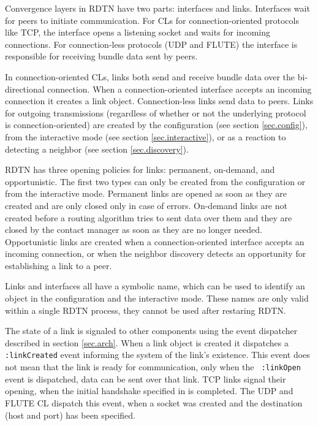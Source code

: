 \documentclass[a4paper]{article}
\begin{document}
Convergence layers in RDTN have two parts: interfaces and links. Interfaces wait
for peers to initiate communication. For CLs for connection-oriented protocols
like TCP, the interface opens a listening socket and waits for incoming
connections. For connection-less protocols (UDP and FLUTE) the interface is
responsible for receiving bundle data sent by peers.

In connection-oriented CLs, links both send and receive bundle data over the
bi-directional connection. When a connection-oriented interface accepts an
incoming connection it creates a link object. Connection-less links send data to
peers. Links for outgoing transmissions (regardless of whether or not the
underlying protocol is connection-oriented) are created by the configuration
(see section \ref{sec.config}), from the interactive mode (see section
\ref{sec.interactive}), or as a reaction to detecting a neighbor (see section
\ref{sec.discovery}).

RDTN has three opening policies for links: permanent, on-demand, and
opportunistic. The first two types can only be created from the
configuration or from the interactive mode. Permanent links are opened as soon
as they are created and are only closed only in case of errors. On-demand links
are not created before a routing algorithm tries to sent data over them and they
are closed by the contact manager as soon as they are no longer needed.
Opportunistic links are created when a connection-oriented interface accepts an
incoming connection, or when the neighbor discovery detects an opportunity for
establishing a link to a peer.

Links and interfaces all have a symbolic name, which can be used to identify an
object in the configuration and the interactive mode. These names are only valid
within a single RDTN process, they cannot be used after restaring RDTN.

The state of a link is signaled to other components using the event dispatcher
described in section \ref{sec.arch}. When a link object is created it dispatches
a {\tt :linkCreated} event informing the system of the link's existence. This
event does not mean that the link is ready for communication, only when the {\tt
:linkOpen} event is dispatched, data can be sent over that link. TCP links
signal their opening, when the initial handshake specified in \cite{dtn-tcp-cl} is
completed. The UDP and FLUTE CL dispatch this event, when a socket was created
and the destination (host and port) has been specified.
\end{document}
